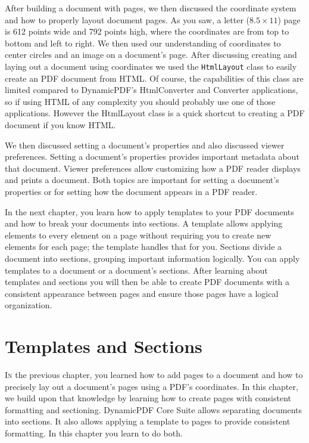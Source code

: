 \documentclass[american]{tufte-book}
\numberwithin{equation}{section}
\numberwithin{figure}{section}
\def\color#1{}%
\begin{document}
After building a document with pages, we then discussed the coordinate
system and how to properly layout document pages. As you saw, a letter ($8.5\times11$) page is 612 points wide and
792 points high, where the coordinates are from top to bottom and
left to right.
We then used our understanding of coordinates to center circles and
an image on a document's page. After discussing creating and laying
out a document using coordinates we used the \texttt{HtmlLayout} class
to easily create an PDF document from HTML. Of course, the capabilities
of this class are limited compared to DynamicPDF's HtmlConverter and
Converter applications, so if using HTML of any complexity you should
probably use one of those applications. However the HtmlLayout class
is a quick shortcut to creating a PDF document if you know HTML.

We then discussed setting a document's properties and also discussed viewer preferences. Setting a document’s properties provides
important metadata about that document. Viewer preferences allow customizing
how a PDF reader displays and prints a document. Both topics are
important for setting a document's properties or for setting how the
document appears in a PDF reader.

In the next chapter, you learn how to apply templates to your
PDF documents and how to break your documents into sections. A template
allows applying elements to every element on a page without requiring you to create new elements for each page; the template handles that for you. Sections divide a document into sections, grouping important information logically.
You can apply templates to a document or a document’s
sections. After learning about templates and sections you will then be
able to create PDF documents with a consistent appearance between
pages and ensure those pages have a logical organization.

\color{white}
\chapter{Templates and Sections}\label{chap:Templates-and-Document}
\color{black}
\BgThispage
\vspace{8.0em}
\lettrine[lines=2,lhang=0.1]{I}{n} the previous chapter, you learned how to add pages to a document and how to precisely lay out a document's
pages using a PDF's coordinates. In this chapter, we build upon that
knowledge by learning how to create pages with consistent formatting
and sectioning. DynamicPDF Core Suite allows separating documents
into sections. It also allows applying a template to pages to provide
consistent formatting. In this chapter you learn to do both.
\end{document}
